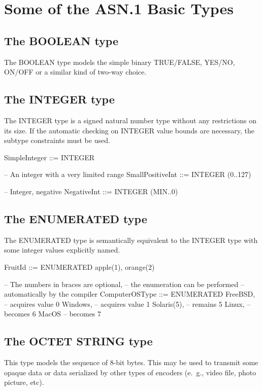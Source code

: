 \documentclass[english,oneside,12pt]{book}
\begin{document}
\section{Some of the ASN.1 Basic Types}


\subsection{The BOOLEAN type}

The BOOLEAN type models the simple binary TRUE/FALSE, YES/NO, ON/OFF
or a similar kind of two-way choice.


\subsection{The INTEGER type}

The INTEGER type is a signed natural number type without any restrictions
on its size. If the automatic checking on INTEGER value bounds are
necessary, the subtype constraints must be used.
\begin{asn}
SimpleInteger ::= INTEGER

-- An integer with a very limited range
SmallPositiveInt ::= INTEGER (0..127)

-- Integer, negative
NegativeInt ::= INTEGER (MIN..0)
\end{asn}

\subsection{The ENUMERATED type}

The ENUMERATED type is semantically equivalent to the INTEGER type
with some integer values explicitly named.
\begin{asn}
FruitId ::= ENUMERATED { apple(1), orange(2) }

-- The numbers in braces are optional,
-- the enumeration can be performed
-- automatically by the compiler
ComputerOSType ::= ENUMERATED {
    FreeBSD,          -- acquires value 0
    Windows,          -- acquires value 1
    Solaris(5),       -- remains 5
    Linux,            -- becomes 6
    MacOS             -- becomes 7
}
\end{asn}

\subsection{The OCTET STRING type}

This type models the sequence of 8-bit bytes. This may be used to
transmit some opaque data or data serialized by other types of encoders
(e.~g., video file, photo picture, etc).
\end{document}
